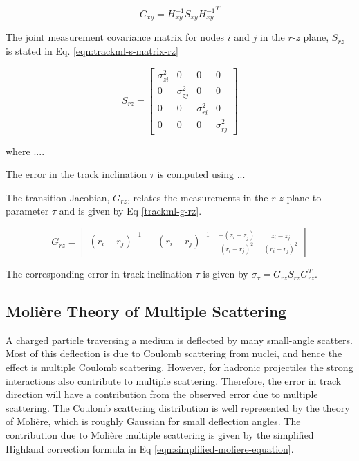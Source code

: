 \begin{equation}
    C_{xy} = H_{xy}^{-1}S_{xy}{H_{xy}^{-1}}^{T}
    \label{eqn:c-xy}
\end{equation}


The joint measurement covariance matrix for nodes $i$ and $j$ in the $r$-$z$ plane, $S_{rz}$ is stated in Eq. \eqref{eqn:trackml-s-matrix-rz}

\begin{equation}
    S_{rz} = \begin{bmatrix} \sigma_{zi}^{2} & 0 & 0 & 0 \\ 
                             0 & \sigma_{zj}^{2} & 0 & 0 \\ 
                             0 & 0 & \sigma_{ri}^{2} & 0 \\
                             0 & 0 & 0 & \sigma_{rj}^{2}
                            \end{bmatrix} 
    \label{eqn:trackml-s-matrix-rz}
\end{equation}


where .... 


The error in the track inclination $\tau$ is computed using ...

The transition Jacobian, $G_{rz}$, relates the measurements in the $r$-$z$ plane to parameter $\tau$ and is given by Eq \eqref{trackml-g-rz}.

\begin{equation}
    G_{rz} = \begin{bmatrix} 
            (r_i - r_j)^{-1} &
            -(r_i - r_j)^{-1} & 
            \frac{-(z_i - z_j)}{(r_i - r_j)^2} & 
            \frac{z_i - z_j}{(r_i - r_j)^2}
            \end{bmatrix} 
    \label{trackml-g-rz}
\end{equation}

The corresponding error in track inclination $\tau$ is given by $\sigma_{\tau} = G_{rz} S_{rz} G_{rz}^{T}$.




\subsection{Moli\`ere Theory of Multiple Scattering}

A charged particle traversing a medium is deflected by many small-angle scatters. Most of this deflection is due to Coulomb scattering from nuclei, and hence the effect is multiple Coulomb scattering. However, for hadronic projectiles the strong interactions also contribute to multiple scattering. Therefore, the error in track direction will have a contribution from the observed error due to multiple scattering. The Coulomb scattering distribution is well represented by the theory of Moli\`ere, which is roughly Gaussian for small deflection angles. The contribution due to Moli\`ere multiple scattering is given by the simplified Highland correction formula \cite{moliere-theory-formula} in Eq \eqref{eqn:simplified-moliere-equation}.

